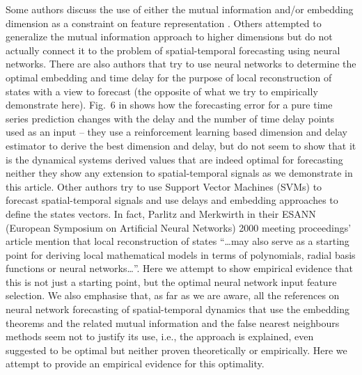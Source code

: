 \documentclass[journal]{IEEEtran}
\begin{document}
Some authors discuss the use of either the mutual information and/or embedding dimension as a constraint on feature representation
\cite{annunziato, Gkana201579, Zachilas2015, Sun2010109, HUANG20108590, 298224, Frank2001, 1998GeoRL..25..457K, 
BUHAMRA2003805, chandra2012cooperative, DBLP:journals/corr/MaslennikovaB14, sauter2010spatio, JiangS11, inputlayer, 1997IJMPC...8.1345K, 
1009-1963-12-6-304, Verdes2000, 1996SoPh..168..423F, 2007AdG....10...67L, Chandra:2012:CCE:2181341.2181747, raios, 
maass2003mathematical,0305-4470-28-12-012, 1995ApJ...444..916C, 1998GeoRL..25..457K, Zachilas2015, Chandra:2012:CCE:2181341.2181747, 
Gkana201579, raios}. Others \cite{Simon:2007:HDS:1230147.1230294} attempted to generalize the mutual 
information approach to higher dimensions but do not actually connect it to the problem of spatial-temporal forecasting using neural networks. 
There are also authors \cite{articleRagulskis} that try to use neural networks to determine the optimal embedding and time 
delay for the purpose of local reconstruction of states with a view to forecast (the opposite of what we try to empirically demonstrate 
here). Fig.\ 6 in \cite{1555956} shows how the forecasting error for a pure time series prediction changes with the delay and the number of 
time delay points used as an input -- they use a reinforcement learning based dimension and delay estimator to derive the best dimension 
and delay, but do not seem to show that it is the dynamical systems derived values that are indeed optimal for forecasting neither
they show any extension to spatial-temporal signals as we demonstrate in this article.
Other authors \cite{Xia2006APF} try to use Support Vector Machines (SVMs) to forecast spatial-temporal signals and use delays and 
embedding approaches to define the states vectors. In fact, Parlitz and Merkwirth \cite{Parlitz2000NonlinearPO} in their
ESANN (European Symposium on Artificial Neural Networks) 2000 meeting proceedings' article mention
 that local reconstruction of states ``\ldots may also serve as
a starting point for deriving local mathematical models in terms of polynomials,
radial basis functions or neural networks\ldots''. Here we attempt to show empirical evidence that this is not just
a starting point, but the optimal neural network input feature selection. We also emphasise that,
 as far as we are aware, all the references on neural network forecasting of spatial-temporal dynamics that use the 
embedding theorems and the related mutual information and the false nearest neighbours methods seem not to justify its use, i.e., 
the approach is explained, even suggested to be optimal but neither proven theoretically or empirically. Here we attempt 
to provide an empirical evidence for this optimality. 
 
\end{document}

